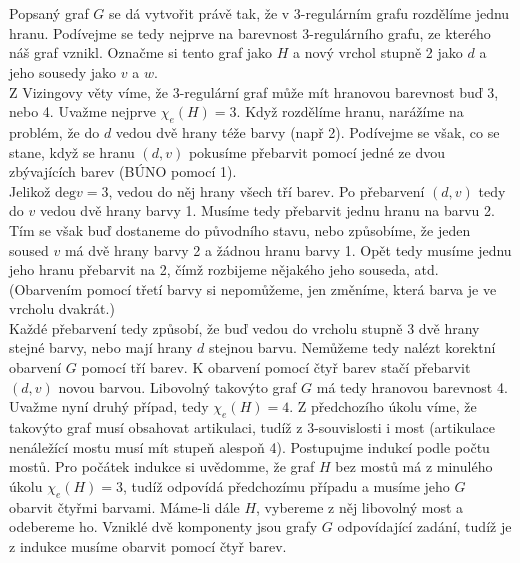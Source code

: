 \documentclass{scrartcl}
\begin{document}
    \section{}
    Popsaný graf $G$ se dá vytvořit právě tak, že v 3-regulárním grafu rozdělíme jednu hranu. Podívejme se tedy nejprve na barevnost 3-regulárního grafu, ze kterého náš graf vznikl. Označme si tento graf jako $H$ a nový vrchol stupně 2 jako $d$ a jeho sousedy jako $v$ a $w$. \\

    Z Vizingovy věty víme, že 3-regulární graf může mít hranovou barevnost buď 3, nebo 4. Uvažme nejprve $\chi_e (H) = 3$. Když rozdělíme hranu,  narážíme na problém, že do $d$ vedou dvě hrany téže barvy (např 2). Podívejme se však, co se stane, když se hranu $(d,v)$ pokusíme přebarvit pomocí jedné ze dvou zbývajících barev (BÚNO pomocí 1). \\

    Jelikož $\text{deg} v = 3$, vedou do něj hrany všech tří barev. Po přebarvení $(d,v)$ tedy do $v$ vedou dvě hrany barvy 1. Musíme tedy přebarvit jednu hranu na barvu 2. Tím se však buď dostaneme do původního stavu, nebo způsobíme, že jeden soused $v$ má dvě hrany barvy 2 a žádnou hranu barvy 1. Opět tedy musíme jednu jeho hranu přebarvit na 2, čímž rozbijeme nějakého jeho souseda, atd. (Obarvením pomocí třetí barvy si nepomůžeme, jen změníme, která barva je ve vrcholu dvakrát.) \\

    Každé přebarvení tedy způsobí, že buď vedou do vrcholu stupně 3 dvě hrany stejné barvy, nebo mají hrany $d$ stejnou barvu. Nemůžeme tedy nalézt korektní obarvení $G$ pomocí tří barev. K obarvení pomocí čtyř barev stačí přebarvit $(d,v)$ novou barvou. Libovolný takovýto graf $G$ má tedy hranovou barevnost 4. \\

    Uvažme nyní druhý případ, tedy $\chi _e (H) = 4$. Z předchozího úkolu víme, že takovýto graf musí obsahovat artikulaci, tudíž z 3-souvislosti i most (artikulace nenáležící mostu musí mít stupeň alespoň 4). Postupujme indukcí podle počtu mostů. Pro počátek indukce si uvědomme, že graf $H$ bez mostů má z minulého úkolu $\chi_e (H) = 3$, tudíž odpovídá předchozímu případu a musíme jeho $G$ obarvit čtyřmi barvami. Máme-li dále $H$, vybereme z něj libovolný most a odebereme ho. Vzniklé dvě komponenty jsou grafy $G$ odpovídající zadání, tudíž je z indukce musíme obarvit pomocí čtyř barev. \\
    
\end{document}

